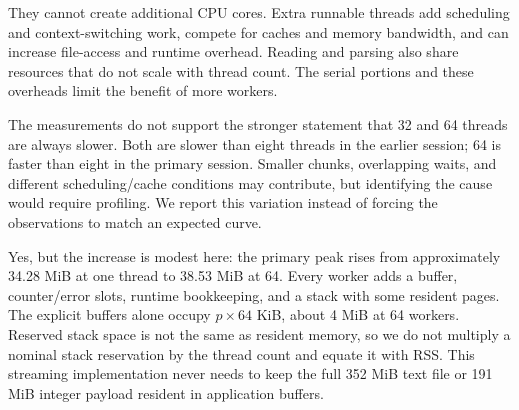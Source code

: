 They cannot create additional CPU cores. Extra runnable threads add scheduling and context-switching work, compete for caches and memory bandwidth, and can increase file-access and runtime overhead. Reading and parsing also share resources that do not scale with thread count. The serial portions and these overheads limit the benefit of more workers.

The measurements do not support the stronger statement that 32 and 64 threads are always slower. Both are slower than eight threads in the earlier session; 64 is faster than eight in the primary session. Smaller chunks, overlapping waits, and different scheduling/cache conditions may contribute, but identifying the cause would require profiling. We report this variation instead of forcing the observations to match an expected curve.

Yes, but the increase is modest here: the primary peak rises from approximately 34.28 MiB at one thread to 38.53 MiB at 64. Every worker adds a buffer, counter/error slots, runtime bookkeeping, and a stack with some resident pages. The explicit buffers alone occupy \(p\times64\) KiB, about 4 MiB at 64 workers. Reserved stack space is not the same as resident memory, so we do not multiply a nominal stack reservation by the thread count and equate it with RSS. This streaming implementation never needs to keep the full 352 MiB text file or 191 MiB integer payload resident in application buffers.
